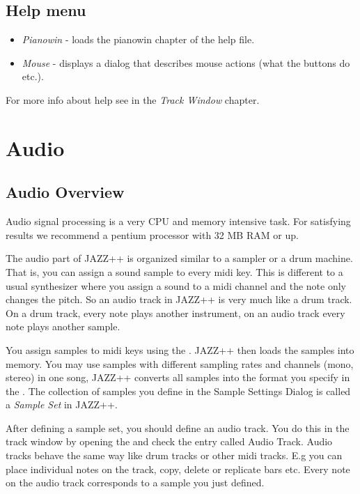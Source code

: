 \documentclass[letterpaper]{report}
\begin{document}
\section{Help menu}

\begin{itemize}

\item {\em Pianowin} - loads the pianowin chapter of the help file.

\item {\em Mouse} - displays a dialog that describes mouse actions (what the buttons
do etc.).

\end{itemize}

For more info about help see  in the {\em Track Window} chapter.


\chapter{Audio}\label{audio}

\section{Audio Overview}\label{audiointro}

Audio signal processing is a very CPU and memory intensive task. For
satisfying results we recommend a pentium processor with 32 MB RAM or
up.

The audio part of JAZZ++ is organized similar to a sampler or a
drum machine. That is, you can assign a sound sample to every midi key.
This is different to a usual synthesizer where you assign a sound
to a midi channel and the note only changes the pitch. So an audio track
in JAZZ++ is very much like a drum track. On a drum track, every
note plays another instrument, on an audio track every note plays
another sample.

You assign samples to midi keys using the . JAZZ++ then loads the samples into memory. You
may use samples with different sampling rates and channels (mono,
stereo) in one song, JAZZ++ converts all samples into the format you
specify in the .
The collection of samples you define in the Sample Settings Dialog
is called a {\em Sample Set} in JAZZ++.

After defining a sample set, you should define an audio track. You do
this in the track window by opening the 
and check the entry called Audio Track. Audio tracks behave the same
way like drum tracks or other midi tracks. E.g you can place individual
notes on the track, copy, delete or replicate bars etc. Every note
on the audio track corresponds to a sample you just defined.
\end{document}
